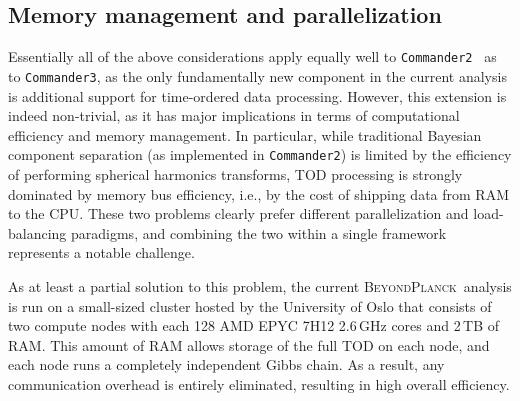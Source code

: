 \documentclass[twocolumn]{aa}
\def\commandertwo{\texttt{Commander2}}
\def\commanderthree{\texttt{Commander3}}
\newcommand{\BP}{\textsc{BeyondPlanck}}
\begin{document}
\subsection{Memory management and parallelization}
\label{sec:memory}

Essentially all of the above considerations apply equally well to
\commandertwo\ \citep{seljebotn:2019} as to \commanderthree, as the
only fundamentally new component in the current analysis is additional
support for time-ordered data processing. However, this extension is
indeed non-trivial, as it has major implications in terms of
computational efficiency and memory management. In particular, while
traditional Bayesian component separation (as implemented in
\commandertwo) is limited by the efficiency of performing spherical
harmonics transforms, TOD processing is strongly dominated by memory
bus efficiency, i.e., by the cost of shipping data from RAM to the
CPU. These two problems clearly prefer different parallelization and
load-balancing paradigms, and combining the two within a single
framework represents a notable challenge.

As at least a partial solution to this problem, the current
\BP\ analysis \citep{BP01} is run on a small-sized cluster hosted by
the University of Oslo that consists of two compute nodes with each
128 AMD EPYC 7H12 2.6\,GHz cores and 2\,TB of RAM. This amount of RAM
allows storage of the full TOD on each node, and each node runs a
completely independent Gibbs chain. As a result, any communication
overhead is entirely eliminated, resulting in high overall efficiency.
\end{document}
